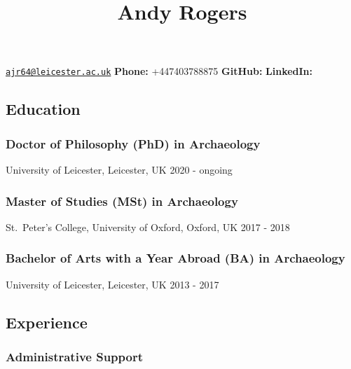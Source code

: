 \documentclass[11pt,a4paper]{article}
\title{\textcolor{devblue}{\large Andy Rogers}}
\author{}
\date{}
\begin{document}
\maketitle

\vspace{-1em}
\noindent\href{mailto:ajr64@leicester.ac.uk}{\texttt{ajr64@leicester.ac.uk}} \hspace{1em}
\textbf{Phone:} +447403788875 \hspace{1em}
\href{https://}{\texttt{}} \hspace{1em}
\textbf{GitHub:} \href{https://github.com/}{\texttt{}} \hspace{1em}
\textbf{LinkedIn:} \href{https://linkedin.com/in/}{\texttt{}}

\vspace{1em}

\subsection{Education}\label{education}

\subsubsection{Doctor of Philosophy (PhD) in
Archaeology}\label{doctor-of-philosophy-phd-in-archaeology}

University of Leicester, Leicester, UK 2020 - ongoing

\subsubsection{Master of Studies (MSt) in
Archaeology}\label{master-of-studies-mst-in-archaeology}

St.~Peter's College, University of Oxford, Oxford, UK 2017 - 2018

\subsubsection{Bachelor of Arts with a Year Abroad (BA) in
Archaeology}\label{bachelor-of-arts-with-a-year-abroad-ba-in-archaeology}

University of Leicester, Leicester, UK 2013 - 2017

\subsection{Experience}\label{experience}

\subsubsection{Administrative Support}\label{administrative-support}
\end{document}
